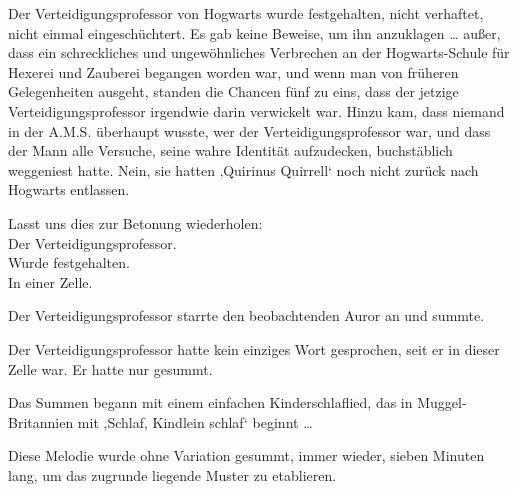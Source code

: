 Der Verteidigungsprofessor von Hogwarts wurde festgehalten, nicht verhaftet, nicht einmal eingeschüchtert. Es gab keine Beweise, um ihn anzuklagen … außer, dass ein schreckliches und ungewöhnliches Verbrechen an der Hogwarts-Schule für Hexerei und Zauberei begangen worden war, und wenn man von früheren Gelegenheiten ausgeht, standen die Chancen fünf zu eins, dass der jetzige Verteidigungsprofessor irgendwie darin verwickelt war. Hinzu kam, dass niemand in der A.M.S. überhaupt wusste, wer der Verteidigungsprofessor war, und dass der Mann alle Versuche, seine wahre Identität aufzudecken, buchstäblich weggeniest hatte.
Nein, sie hatten ‚Quirinus Quirrell‘ noch nicht zurück nach Hogwarts entlassen.




Lasst uns dies zur Betonung wiederholen:\\
Der Verteidigungsprofessor.\\
Wurde festgehalten.\\
In einer Zelle.

Der Verteidigungsprofessor starrte den beobachtenden Auror an und summte.

Der Verteidigungsprofessor hatte kein einziges Wort gesprochen, seit er in dieser Zelle war. Er hatte nur gesummt.

Das Summen begann mit einem einfachen Kinderschlaflied, das in Muggel-Britannien mit ‚Schlaf, Kindlein schlaf‘ beginnt …

Diese Melodie wurde ohne Variation gesummt, immer wieder, sieben Minuten lang, um das zugrunde liegende Muster zu etablieren.

